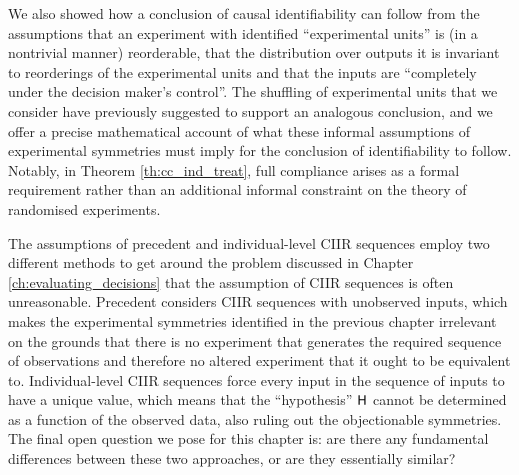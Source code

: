 We also showed how a conclusion of causal identifiability can follow from the assumptions that an experiment with identified ``experimental units'' is (in a nontrivial manner) reorderable, that the distribution over outputs it is invariant to reorderings of the experimental units and that the inputs are ``completely under the decision maker's control''. The shuffling of experimental units that we consider have previously suggested to support an analogous conclusion, and we offer a precise mathematical account of what these informal assumptions of experimental symmetries must imply for the conclusion of identifiability to follow. Notably, in Theorem \ref{th:cc_ind_treat}, full compliance arises as a formal requirement rather than an additional informal constraint on the theory of randomised experiments.

The assumptions of precedent and individual-level CIIR sequences employ two different methods to get around the problem discussed in Chapter \ref{ch:evaluating_decisions} that the assumption of CIIR sequences is often unreasonable. Precedent considers CIIR sequences with unobserved inputs, which makes the experimental symmetries identified in the previous chapter irrelevant on the grounds that there is no experiment that generates the required sequence of observations and therefore no altered experiment that it ought to be equivalent to. Individual-level CIIR sequences force every input in the sequence of inputs to have a unique value, which means that the ``hypothesis'' $\mathsf{H}$ cannot be determined as a function of the observed data, also ruling out the objectionable symmetries. The final open question we pose for this chapter is: are there any fundamental differences between these two approaches, or are they essentially similar?